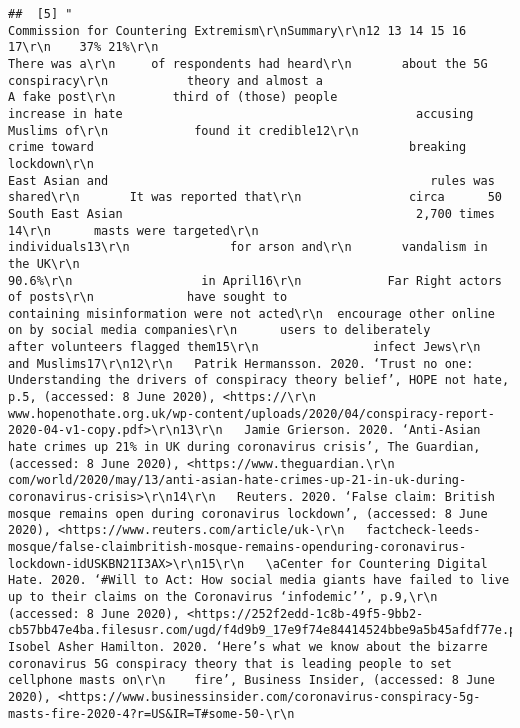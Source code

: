 \documentclass[
]{book}
\begin{document}
\begin{verbatim}
##  [5] "                                                     Commission for Countering Extremism\r\nSummary\r\n12 13 14 15 16 17\r\n    37% 21%\r\n                                                          There was a\r\n     of respondents had heard\r\n       about the 5G conspiracy\r\n           theory and almost a                                                                                             A fake post\r\n        third of (those) people                          increase in hate                                         accusing Muslims of\r\n            found it credible12\r\n                                                            crime toward                                            breaking lockdown\r\n                                                           East Asian and                                             rules was shared\r\n       It was reported that\r\n               circa      50                            South East Asian                                         2,700 times                             14\r\n      masts were targeted\r\n                                                              individuals13\r\n              for arson and\r\n       vandalism in the UK\r\n                                                                   90.6%\r\n                  in April16\r\n            Far Right actors                                                                                                    of posts\r\n             have sought to                             containing misinformation were not acted\r\n  encourage other online                                              on by social media companies\r\n      users to deliberately                                         after volunteers flagged them15\r\n                infect Jews\r\n             and Muslims17\r\n12\r\n   Patrik Hermansson. 2020. ‘Trust no one: Understanding the drivers of conspiracy theory belief’, HOPE not hate, p.5, (accessed: 8 June 2020), <https://\r\n   www.hopenothate.org.uk/wp-content/uploads/2020/04/conspiracy-report-2020-04-v1-copy.pdf>\r\n13\r\n   Jamie Grierson. 2020. ‘Anti-Asian hate crimes up 21% in UK during coronavirus crisis’, The Guardian, (accessed: 8 June 2020), <https://www.theguardian.\r\n   com/world/2020/may/13/anti-asian-hate-crimes-up-21-in-uk-during-coronavirus-crisis>\r\n14\r\n   Reuters. 2020. ‘False claim: British mosque remains open during coronavirus lockdown’, (accessed: 8 June 2020), <https://www.reuters.com/article/uk-\r\n   factcheck-leeds-mosque/false-claimbritish-mosque-remains-openduring-coronavirus-lockdown-idUSKBN21I3AX>\r\n15\r\n   \aCenter for Countering Digital Hate. 2020. ‘#Will to Act: How social media giants have failed to live up to their claims on the Coronavirus ‘infodemic’’, p.9,\r\n    (accessed: 8 June 2020), <https://252f2edd-1c8b-49f5-9bb2-cb57bb47e4ba.filesusr.com/ugd/f4d9b9_17e9f74e84414524bbe9a5b45afdf77e.pdf>\r\n16\r\n    Isobel Asher Hamilton. 2020. ‘Here’s what we know about the bizarre coronavirus 5G conspiracy theory that is leading people to set cellphone masts on\r\n    fire’, Business Insider, (accessed: 8 June 2020), <https://www.businessinsider.com/coronavirus-conspiracy-5g-masts-fire-2020-4?r=US&IR=T#some-50-\r\n    
\end{verbatim}
\end{document}
